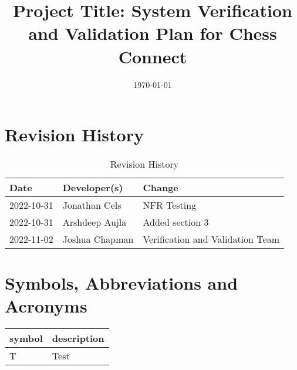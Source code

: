 \documentclass[12pt, titlepage]{article}
\begin{document}
\title{Project Title: System Verification and Validation Plan for Chess Connect} 
\author{\authname}
\date{\today}
	
\maketitle


\section{Revision History}

\begin{table}[hp]
\caption{Revision History} \label{TblRevisionHistory}
\begin{tabularx}{\textwidth}{llX}
\toprule
\textbf{Date} & \textbf{Developer(s)} & \textbf{Change}\\
\midrule
2022-10-31 & Jonathan Cels & NFR Testing\\
2022-10-31 & Arshdeep Aujla & Added section 3\\
2022-11-02 & Joshua Chapman & Verification and Validation Team\\
\bottomrule
\end{tabularx}
\end{table}

\newpage

\tableofcontents

\listoftables
{}

\listoffigures
{}

\newpage

\section{Symbols, Abbreviations and Acronyms}

\renewcommand{\arraystretch}{1.2}
\begin{tabular}{l l} 
  \toprule		
  \textbf{symbol} & \textbf{description}\\
  \midrule 
  T & Test\\
  \bottomrule
\end{tabular}\\


\newpage
\end{document}
